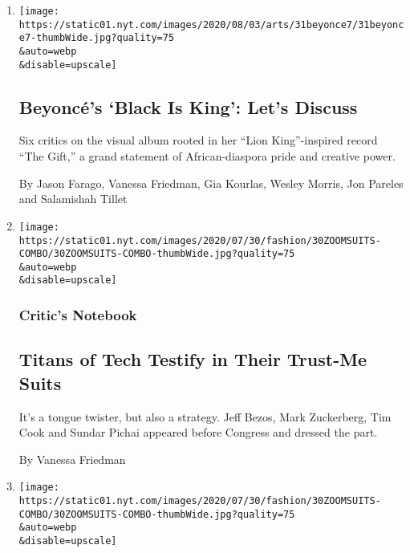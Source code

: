\begin{enumerate}
\def\labelenumi{\arabic{enumi}.}
\item
  \href{/2020/07/31/arts/music/beyonce-black-is-king.html}{}

  \texttt{[image: https://static01.nyt.com/images/2020/08/03/arts/31beyonce7/31beyonce7-thumbWide.jpg?quality=75\\\&auto=webp\\\&disable=upscale]}

  \hypertarget{beyoncuxe9s-black-is-king-lets-discuss}{%
  \subsection{Beyoncé's `Black Is King': Let's
  Discuss}\label{beyoncuxe9s-black-is-king-lets-discuss}}

  Six critics on the visual album rooted in her ``Lion King''-inspired
  record ``The Gift,'' a grand statement of African-diaspora pride and
  creative power.

  By Jason Farago, Vanessa Friedman, Gia Kourlas, Wesley Morris, Jon
  Pareles and Salamishah Tillet
\item
  \href{/2020/07/29/style/Bezos-zuckerberg-cook-pichai-testimony-suits.html}{}

  \texttt{[image: https://static01.nyt.com/images/2020/07/30/fashion/30ZOOMSUITS-COMBO/30ZOOMSUITS-COMBO-thumbWide.jpg?quality=75\\\&auto=webp\\\&disable=upscale]}

  \hypertarget{critics-notebook}{%
  \subsubsection{Critic's Notebook}\label{critics-notebook}}

  \hypertarget{titans-of-tech-testify-in-their-trust-me-suits}{%
  \subsection{Titans of Tech Testify in Their Trust-Me
  Suits}\label{titans-of-tech-testify-in-their-trust-me-suits}}

  It's a tongue twister, but also a strategy. Jeff Bezos, Mark
  Zuckerberg, Tim Cook and Sundar Pichai appeared before Congress and
  dressed the part.

  By Vanessa Friedman
\item
  \href{/live/2020/07/29/technology/tech-ceos-hearing-testimony/the-ceos-dressed-to-project-humility-our-fashion-critic-writes}{}

  \texttt{[image: https://static01.nyt.com/images/2020/07/30/fashion/30ZOOMSUITS-COMBO/30ZOOMSUITS-COMBO-thumbWide.jpg?quality=75\\\&auto=webp\\\&disable=upscale]}


\end{enumerate}
